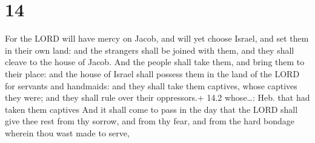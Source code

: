 \hypertarget{section-13}{%
\section{14}\label{section-13}}

 For the LORD will have mercy on Jacob, and will yet choose
Israel, and set them in their own land: and the strangers shall be
joined with them, and they shall cleave to the house of Jacob.
 And the people shall take them, and bring them to their
place: and the house of Israel shall possess them in the land of the
LORD for servants and handmaids: and they shall take them captives,
whose captives they were; and they shall rule over their oppressors.+
14.2 whose\ldots: Heb. that had taken them captives  And it
shall come to pass in the day that the LORD shall give thee rest from
thy sorrow, and from thy fear, and from the hard bondage wherein thou
wast made to serve,

